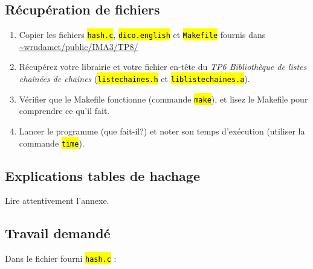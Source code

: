 \documentclass[final, pdftex, a4paper, openbib, ]{article}
\let\OldTexttt\texttt
\renewcommand{\texttt}[1]{\OldTexttt{\hl{#1}}}
\begin{document}
\subsection{Récupération de fichiers}

\begin{enumerate}
	\item Copier les fichiers \texttt{hash.c}, \texttt{dico.english} et \texttt{Makefile} fournis dans \url{~wrudamet/public/IMA3/TP8/}
	\item Récupérez votre librairie et votre fichier en-tête du \textit{TP6 Bibliothèque de listes chaînées de chaînes} (\texttt{listechaines.h} et \texttt{liblistechaines.a}).
	\item Vérifier que le Makefile fonctionne (commande \texttt{make}), et lisez le Makefile pour comprendre ce qu'il fait.
	\item Lancer le programme (que fait-il?) et noter son temps d'exécution (utiliser la commande \texttt{time}).
\end{enumerate}	


\subsection{Explications tables de hachage}
Lire attentivement l'annexe.


\subsection{Travail demandé}
	Dans le fichier fourni \texttt{hash.c} :
\end{document}
